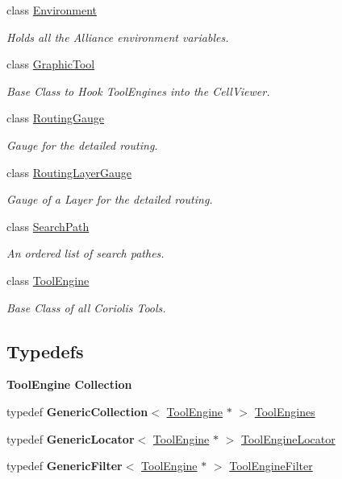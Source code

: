 \begin{DoxyCompactItemize}
class \mbox{\hyperlink{classCRL_1_1Environment}{Environment}}
\begin{DoxyCompactList}\small\item\em Holds all the Alliance environment variables. \end{DoxyCompactList}\item 
class \mbox{\hyperlink{classCRL_1_1GraphicTool}{Graphic\+Tool}}
\begin{DoxyCompactList}\small\item\em Base Class to Hook Tool\+Engines into the Cell\+Viewer. \end{DoxyCompactList}\item 
class \mbox{\hyperlink{classCRL_1_1RoutingGauge}{Routing\+Gauge}}
\begin{DoxyCompactList}\small\item\em Gauge for the detailed routing. \end{DoxyCompactList}\item 
class \mbox{\hyperlink{classCRL_1_1RoutingLayerGauge}{Routing\+Layer\+Gauge}}
\begin{DoxyCompactList}\small\item\em Gauge of a Layer for the detailed routing. \end{DoxyCompactList}\item 
class \mbox{\hyperlink{classCRL_1_1SearchPath}{Search\+Path}}
\begin{DoxyCompactList}\small\item\em An ordered list of search pathes. \end{DoxyCompactList}\item 
class \mbox{\hyperlink{classCRL_1_1ToolEngine}{Tool\+Engine}}
\begin{DoxyCompactList}\small\item\em Base Class of all Coriolis Tools. \end{DoxyCompactList}\end{DoxyCompactItemize}
\subsection*{Typedefs}
\begin{Indent}\textbf{ Tool\+Engine Collection}\par
\begin{DoxyCompactItemize}
\item 
typedef \textbf{ Generic\+Collection}$<$ \mbox{\hyperlink{classCRL_1_1ToolEngine}{Tool\+Engine}} $\ast$ $>$ \mbox{\hyperlink{namespaceCRL_ae49bc0c5f113bba964680768556dd1b3}{Tool\+Engines}}
\item 
typedef \textbf{ Generic\+Locator}$<$ \mbox{\hyperlink{classCRL_1_1ToolEngine}{Tool\+Engine}} $\ast$ $>$ \mbox{\hyperlink{namespaceCRL_a9c6426dc361a7b02fc55b7c19401c7aa}{Tool\+Engine\+Locator}}
\item 
typedef \textbf{ Generic\+Filter}$<$ \mbox{\hyperlink{classCRL_1_1ToolEngine}{Tool\+Engine}} $\ast$ $>$ \mbox{\hyperlink{namespaceCRL_a976ed6ed06b1c3510c696de4c8960971}{Tool\+Engine\+Filter}}
\end{DoxyCompactItemize}
\end{Indent}


